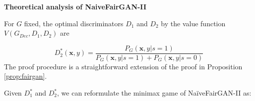 \documentclass[sigconf]{acmart}
\theoremstyle{definition}
\newtheorem{prop}{Proposition}
\newtheorem{theorem}{Theorem}
\begin{document}
{\bf \noindent Theoretical analysis of NaiveFairGAN-II}

For $G$ fixed, the optimal discriminators $D_1$ and $D_2$ by the value function $V(G_{Dec}, D_1, D_2)$ are


\[
	D_2^*(\mathbf{x},y) = \frac{P_{G}(\mathbf{x},y|s=1)}{P_{G}(\mathbf{x},y|s=1)+P_{G}(\mathbf{x},y|s=0)}
\]
 The proof procedure is a straightforward extension of the proof in Proposition \ref{prop:fairgan}.


Given $D_1^*$ and $D_2^*$, we can reformulate the minimax game of Na\"iveFairGAN-II as:
\end{document}
